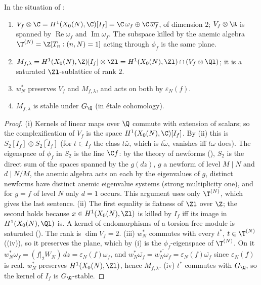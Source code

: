 \begin{proposition}\label{prop:moddeg:f-lattice}
In the situation of :
\begin{enumerate}[label=(\roman*)]
\item $V_f\otimes\C=H^1(X_0(N),\C)[I_f]=\C\,\omega_f\oplus\C\,\overline{\omega_f}$, of dimension $2$; $V_f\otimes\R$ is spanned by $\operatorname{Re}\omega_f$ and $\operatorname{Im}\omega_f$. The subspace killed by
the anemic algebra $\T^{(N)}=\Z[T_n:(n,N)=1]$ acting through $\phi_f$ is the same plane.
\item $M_{f,\lambda}=H^1(X_0(N),\Z)[I_f]\otimes\Zl=H^1(X_0(N),\Zl)\cap(V_f\otimes\Ql)$; it is a saturated $\Zl$-sublattice of rank $2$.
\item $w_N^*$ preserves $V_f$ and $M_{f,\lambda}$, and acts on both by $\varepsilon_N(f)$.
\item $M_{f,\lambda}$ is stable under $G_\Q$ (in \'etale cohomology).
\end{enumerate}
\end{proposition}

\begin{proof}
(i) Kernels of linear maps over $\Q$ commute with extension of scalars; so the complexification of $V_f$ is the space $H^1(X_0(N),\C)[I_f]$. By (ii) this is
$S_2[I_f]\oplus\overline{S_2[I_f]}$ (for $t\in I_f$ the class $t\bar\omega$, which is $\overline{t\omega}$, vanishes iff $t\omega$ does). The eigenspace of $\phi_f$ in $S_2$ is the line $\C f$: by the theory of
newforms (), $S_2$ is the direct sum of the spaces spanned by the $g(dz)$, $g$ a newform of level $M\mid N$ and $d\mid N/M$, the anemic algebra acts on each
by the eigenvalues of $g$, distinct newforms have distinct anemic eigenvalue systems (strong multiplicity one), and for $g=f$ of level $N$ only $d=1$ occurs. This argument
uses only $\T^{(N)}$, which gives the last sentence. (ii) The first equality is flatness of $\Zl$ over $\Z$; the second holds because $x\in H^1(X_0(N),\Zl)$ is killed by $I_f$ iff
its image in $H^1(X_0(N),\Ql)$ is. A kernel of endomorphisms of a torsion-free module is saturated (). The rank is $\dim V_f=2$. (iii) $w_N^*$ commutes with every
$t^*$, $t\in\T^{(N)}$ ((iv)), so it preserves the plane, which by (i) is the $\phi_f$-eigenspace of $\T^{(N)}$. On it $w_N^*\omega_f=(f|_2W_N)\,dz=\varepsilon_N(f)\omega_f$,
and $w_N^*\overline{\omega_f}=\overline{w_N^*\omega_f}=\varepsilon_N(f)\overline{\omega_f}$ since $\varepsilon_N(f)$ is real. $w_N^*$ preserves $H^1(X_0(N),\Zl)$, hence $M_{f,\lambda}$. (iv) $t^*$ commutes with
$G_\Q$, so the kernel of $I_f$ is $G_\Q$-stable.
\end{proof}

